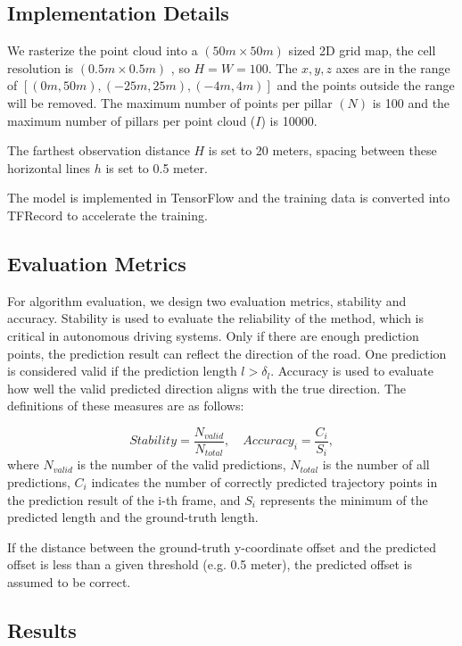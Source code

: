 \documentclass[letterpaper,10 pt,conference]{ieeeconf}  %
\begin{document}
\subsection{Implementation Details}
We rasterize the point cloud into a $(50m\times50m)$ sized 2D grid map, the cell resolution is $(0.5m\times0.5m)$ , so $H=W=100$. The $x, y, z$ axes are in the range of $[(0m, 50m),(-25m, 25m),(-4m, 4m)]$ and the points outside the range will be removed. The maximum number of points per pillar $(N)$ is 100 and the maximum number of pillars per point cloud ($I$) is 10000.

The farthest observation distance $H$ is set to 20 meters, spacing between these horizontal lines $h$ is set to 0.5 meter.

The model is implemented in TensorFlow\cite{tensorflow2015-whitepaper} and the training data is converted into TFRecord to accelerate the training.

\subsection{Evaluation Metrics}
For algorithm evaluation, we design two evaluation metrics, stability and accuracy. Stability is used to evaluate the reliability of the method, which is critical in autonomous driving systems. Only if there are enough prediction points, the prediction result can reflect the direction of the road. One prediction is considered valid if the prediction length $l>\delta_l $. Accuracy is used to evaluate how well the valid predicted direction aligns with the true direction. The definitions of these measures are as follows:

\begin{equation}
    Stability = \frac{N_{valid}}{N_{total}}, \quad Accuracy_i=\frac{C_i}{S_i}, 
\end{equation}
where $N_{valid}$ is the number of the valid predictions, $N_{total}$ is the number of all predictions, $C_i$ indicates the number of correctly predicted trajectory points in the prediction result of the i-th frame, and $S_i$ represents the minimum of the predicted length and the ground-truth length.

If the distance between the ground-truth y-coordinate offset and the predicted offset is less than a given threshold (e.g. 0.5 meter), the predicted offset is assumed to be correct.

\subsection{Results}
\end{document}
